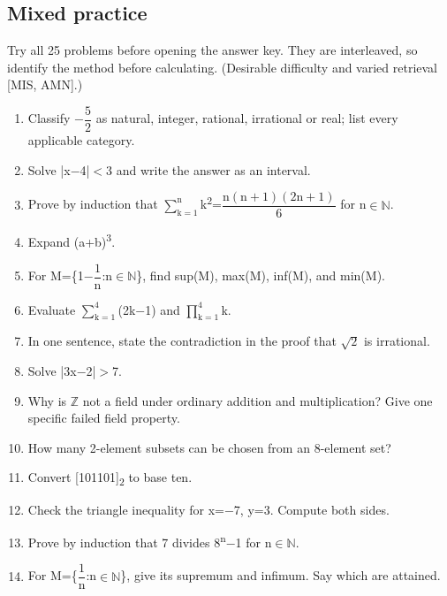 \documentclass[11pt]{article}
\begin{document}
\clearpage

\begin{keepsection}
\section{Mixed practice}

Try all 25 problems before opening the answer key. They are interleaved, so identify the method before calculating. (Desirable difficulty and varied retrieval [MIS, AMN].)

\begin{enumerate}
\item Classify \ensuremath{-}{\small\ensuremath{\dfrac{5}{2}}} as natural, integer, rational, irrational or real; list every applicable category.
\item Solve |x\ensuremath{-}4|\ensuremath{<}3 and write the answer as an interval.
\item Prove by induction that $\sum_{\mathrm{k}=1}^{\mathrm{n}} $k\textsuperscript{2}={\small\ensuremath{\dfrac{\mathrm{n}(\mathrm{n}+1)(2\mathrm{n}+1)}{6}}} for n\ensuremath{\in}\ensuremath{\mathbb{N}}.
\item Expand (a+b)\textsuperscript{3}.
\item For M=\{1\ensuremath{-}{\small\ensuremath{\dfrac{1}{\mathrm{n}}}}:n\ensuremath{\in}\ensuremath{\mathbb{N}}\}, find sup(M), max(M), inf(M), and min(M).
\item Evaluate $\sum_{\mathrm{k}=1}^{4} $(2k\ensuremath{-}1) and $\prod_{\mathrm{k}=1}^{4} $k.
\item In one sentence, state the contradiction in the proof that \ensuremath{\sqrt{2}} is irrational.
\item Solve |3x\ensuremath{-}2|\ensuremath{>}7.
\item Why is \ensuremath{\mathbb{Z}} not a field under ordinary addition and multiplication? Give one specific failed field property.
\item How many 2-element subsets can be chosen from an 8-element set?
\item Convert [101101]\textsubscript{2} to base ten.
\item Check the triangle inequality for x=\ensuremath{-}7, y=3. Compute both sides.
\item Prove by induction that 7 divides 8\textsuperscript{n}\ensuremath{-}1 for n\ensuremath{\in}\ensuremath{\mathbb{N}}.
\item For M=\{{\small\ensuremath{\dfrac{1}{\mathrm{n}}}}:n\ensuremath{\in}\ensuremath{\mathbb{N}}\}, give its supremum and infimum. Say which are attained.

\end{enumerate}
\end{keepsection}
\end{document}
